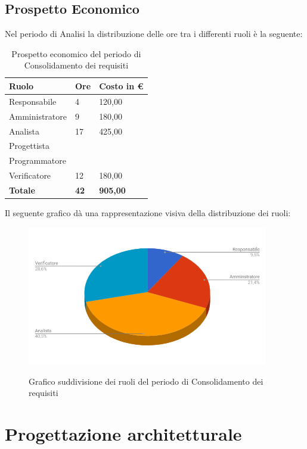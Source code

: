\documentclass[PianoDiProgetto.tex]{subfiles}
\begin{document}
\subsection{Prospetto Economico}
Nel periodo di Analisi la distribuzione delle ore tra i differenti ruoli è la seguente:
\begin{center}
\begin{table}[htbp]
	\centering
	\renewcommand\arraystretch{1.5}
	\begin{tabularx}{\textwidth}{p{5cm}|p{4cm}|p{4cm}}
		\hline
		\textbf{Ruolo} & \textbf{Ore} & \textbf{Costo in \euro} \\
		\hline
		Responsabile & 4 & 120,00 \\
		\hline
		Amministratore & 9 & 180,00 \\
		\hline
		Analista & 17 & 425,00 \\
		\hline
		Progettista & \ & \ \\
		\hline
		Programmatore & \ & \ \\
		\hline
		Verificatore & 12 & 180,00 \\
		\hline
		\textbf{Totale} & \textbf{42} & \textbf{905,00}\\
		\hline
	\end{tabularx}
\caption{Prospetto economico del periodo di Consolidamento dei requisiti}
\label{my-label}
\end{table} 
\end{center}
\clearpage
Il seguente grafico dà una rappresentazione visiva della distribuzione dei ruoli:
\begin{figure}[h]
	\centering
	\includegraphics[width=10.5cm]{images/prospettoEconomico/consolidamento.png}
	\label{fig:foo}
	\caption{Grafico suddivisione dei ruoli del periodo di Consolidamento dei requisiti}
\end{figure} 
\clearpage
\section{Progettazione architetturale}
\end{document}
